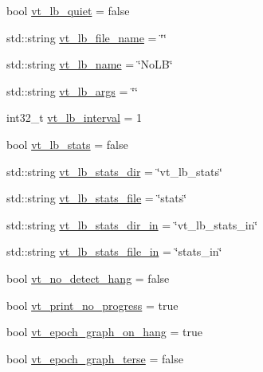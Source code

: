 \begin{DoxyCompactItemize}
\item 
bool \hyperlink{structvt_1_1arguments_1_1_app_config_a7942c44d537f66f507209de26cbbb55d}{vt\+\_\+lb\+\_\+quiet} = false
\item 
std\+::string \hyperlink{structvt_1_1arguments_1_1_app_config_a53287cd1d5e9fbb62931b956b0770d93}{vt\+\_\+lb\+\_\+file\+\_\+name} = \char`\"{}\char`\"{}
\item 
std\+::string \hyperlink{structvt_1_1arguments_1_1_app_config_a1d8ed9d03eb82a15a81ad5e1ca6388b4}{vt\+\_\+lb\+\_\+name} = \char`\"{}No\+LB\char`\"{}
\item 
std\+::string \hyperlink{structvt_1_1arguments_1_1_app_config_ab2811622e1d9627bd2af4add74b7ffc9}{vt\+\_\+lb\+\_\+args} = \char`\"{}\char`\"{}
\item 
int32\+\_\+t \hyperlink{structvt_1_1arguments_1_1_app_config_a8d23afe2b4a2ac7d7354e3379f5b24ae}{vt\+\_\+lb\+\_\+interval} = 1
\item 
bool \hyperlink{structvt_1_1arguments_1_1_app_config_ae068940c3112fa20643649e22ecf6d20}{vt\+\_\+lb\+\_\+stats} = false
\item 
std\+::string \hyperlink{structvt_1_1arguments_1_1_app_config_adb78fa14bd7976375bfba0e01852729f}{vt\+\_\+lb\+\_\+stats\+\_\+dir} = \char`\"{}vt\+\_\+lb\+\_\+stats\char`\"{}
\item 
std\+::string \hyperlink{structvt_1_1arguments_1_1_app_config_a0e105137c152e366877505914c51c467}{vt\+\_\+lb\+\_\+stats\+\_\+file} = \char`\"{}stats\char`\"{}
\item 
std\+::string \hyperlink{structvt_1_1arguments_1_1_app_config_a8e3afb199f0e872d2840a5f27bcbd70f}{vt\+\_\+lb\+\_\+stats\+\_\+dir\+\_\+in} = \char`\"{}vt\+\_\+lb\+\_\+stats\+\_\+in\char`\"{}
\item 
std\+::string \hyperlink{structvt_1_1arguments_1_1_app_config_ae773bb249b36958811231e0ef079d502}{vt\+\_\+lb\+\_\+stats\+\_\+file\+\_\+in} = \char`\"{}stats\+\_\+in\char`\"{}
\item 
bool \hyperlink{structvt_1_1arguments_1_1_app_config_a5cab0e03f494700d6b27aff2c8a1399c}{vt\+\_\+no\+\_\+detect\+\_\+hang} = false
\item 
bool \hyperlink{structvt_1_1arguments_1_1_app_config_ab8b0ebcbe69f49e525bf5ce152ad43f5}{vt\+\_\+print\+\_\+no\+\_\+progress} = true
\item 
bool \hyperlink{structvt_1_1arguments_1_1_app_config_af7f54f986814f23a1c53932f8bf52e3c}{vt\+\_\+epoch\+\_\+graph\+\_\+on\+\_\+hang} = true
\item 
bool \hyperlink{structvt_1_1arguments_1_1_app_config_a25d80ec055614d39dd4039dde1faa94e}{vt\+\_\+epoch\+\_\+graph\+\_\+terse} = false

\end{DoxyCompactItemize}
